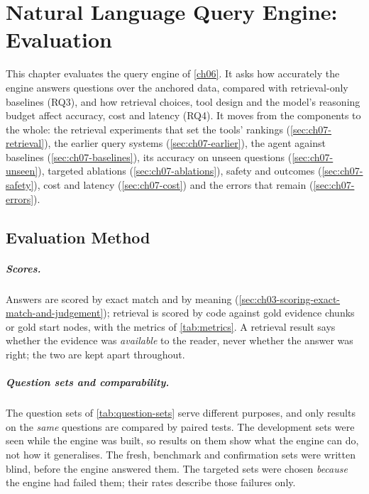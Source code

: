 \chapter{Natural Language Query Engine: Evaluation}\label{ch07}

This chapter evaluates the query engine of \cref{ch06}. It asks how accurately the engine answers questions over the
anchored data, compared with retrieval-only baselines (RQ3), and how retrieval choices, tool design and the model's
reasoning budget affect accuracy, cost and latency (RQ4). It moves from the components to the whole: the retrieval
experiments that set the tools' rankings (\cref{sec:ch07-retrieval}), the earlier query systems
(\cref{sec:ch07-earlier}), the agent against baselines (\cref{sec:ch07-baselines}), its accuracy on unseen questions
(\cref{sec:ch07-unseen}), targeted ablations (\cref{sec:ch07-ablations}), safety and outcomes
(\cref{sec:ch07-safety}), cost and latency (\cref{sec:ch07-cost}) and the errors that remain
(\cref{sec:ch07-errors}).

\section{Evaluation Method}\label{sec:ch07-method}

\paragraph{Scores.} Answers are scored by exact match and by meaning (\cref{sec:ch03-scoring-exact-match-and-judgement});
retrieval is scored by code against gold evidence chunks or gold start nodes, with the metrics of
\cref{tab:metrics}. A retrieval result says whether the evidence was \emph{available} to the reader, never whether
the answer was right; the two are kept apart throughout.

\paragraph{Question sets and comparability.} The question sets of \cref{tab:question-sets} serve different purposes,
and only results on the \emph{same} questions are compared by paired tests. The development sets were seen while the
engine was built, so results on them show what the engine can do, not how it generalises. The fresh, benchmark and
confirmation sets were written blind, before the engine answered them. The targeted sets were chosen \emph{because} the
engine had failed them; their rates describe those failures only.

